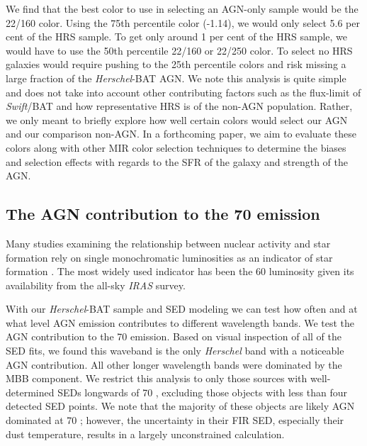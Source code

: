 \documentclass[fleqn, usenatbib]{mnras}
\newcommand{\herschel}{\emph{Herschel}}
\newcommand{\swift}{\textit{Swift}}
\begin{document}
We find that the best color to use in selecting an AGN-only sample would be the 22/160 color. Using the 75th percentile color (-1.14), we would only select 5.6 per cent of the HRS sample. To get only around 1 per cent of the HRS sample, we would have to use the 50th percentile 22/160 or 22/250 color. To select no HRS galaxies would require pushing to the 25th percentile colors and risk missing a large fraction of the \herschel-BAT AGN. We note this analysis is quite simple and does not take into account other contributing factors such as the flux-limit of \swift/BAT and how representative HRS is of the non-AGN population. Rather, we only meant to briefly explore how well certain colors would select our AGN and our comparison non-AGN. In a forthcoming paper, we aim to evaluate these colors along with other MIR color selection techniques \cite[e.g.][]{Donley:2012qy, Stern:2012mz} to determine the biases and selection effects with regards to the SFR of the galaxy and strength of the AGN.

\subsection{The AGN contribution to the 70 \micron{} emission}\label{sec:agn_70_contribution}
Many studies examining the relationship between nuclear activity and star formation rely on single monochromatic luminosities as an indicator of star formation \cite[e.g.][]{Netzer:2007ve, Netzer:2009lr, Rosario:2012fr}. The most widely used indicator has been the 60 \micron{} luminosity given its availability from the all-sky \textit{IRAS} survey. 

With our \herschel-BAT sample and SED modeling we can test how often and at what level AGN emission contributes to different wavelength bands. We test the AGN contribution to the 70 \micron{} emission. Based on visual inspection of all of the SED fits, we found this waveband is the only \herschel{} band with a noticeable AGN contribution. All other longer wavelength bands were dominated by the MBB component. We restrict this analysis to only those sources with well-determined SEDs longwards of 70 \micron, excluding those objects with less than four detected SED points. We note that the majority of these objects are likely AGN dominated at 70 \micron; however, the uncertainty in their FIR SED, especially their dust temperature, results in a largely unconstrained calculation.
\end{document}

